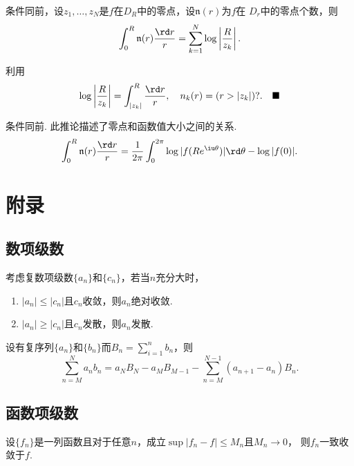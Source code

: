   \begin{lemma}
    条件同前，设$z_1,\dots,z_N$是$f$在$D_R$中的零点，设$\mathfrak{n}(r)$为$f$在
    $D_r$中的零点个数，则
    \[
      \int_0^R \mathfrak{n}(r)\frac{\rd r}{r} = 
      \sum_{k=1}^N\log\left| \frac{R}{z_k} \right|.
    \]
  \end{lemma}
  \proof
    利用
    \[
      \log\left| \frac{R}{z_k} \right|=\int_{|z_k|}^R\frac{\rd r}{r},
      \quad n_k(r) = ( r > |z_k| )?.\quad\blacksquare
    \]

  \begin{cor}
    条件同前. 此推论描述了零点和函数值大小之间的关系.
    \[
      \int_0^R\mathfrak{n}(r)\frac{\rd r}{r} = \frac{1}{2\pi}
      \int_0^{2\pi}\log|f(Re^{\iu\theta})|\rd\theta - \log|f(0)|.
    \]
  \end{cor}


\newpage
\section{附录}

\subsection{数项级数}

  \begin{thm}
    考虑复数项级数$\{a_n\}$和$\{c_n\}$，若当$n$充分大时，
    \begin{enumerate}
      \item $|a_n| \le |c_n|$且$c_n$收敛，则$a_n$绝对收敛.
      \item $|a_n| \ge |c_n|$且$c_n$发散，则$a_n$发散.
    \end{enumerate}
  \end{thm}

  \begin{thm}[分部求和]
    \label{thm: 分部求和}
    设有复序列$\{a_n\}$和$\{b_n\}$而$B_n=\sum_{i=1}^nb_n$，则
    \[
      \sum_{n=M}^N a_nb_n = a_NB_N - a_MB_{M-1} -
      \sum_{n=M}^{N-1}(a_{n+1}-a_n)B_n.
    \]
  \end{thm}

\subsection{函数项级数}

  \begin{thm}
    设$\{f_n\}$是一列函数且对于任意$n$，成立$\sup|f_n-f|\le M_n$且$M_n\to 0$，
    则$f_n$一致收敛于$f$.
  \end{thm}


